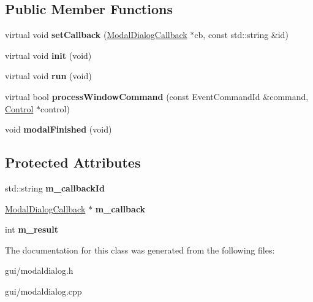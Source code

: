 \subsection*{Public Member Functions}
\begin{DoxyCompactItemize}
\item 
virtual void {\bfseries set\+Callback} (\hyperlink{classModalDialogCallback}{Modal\+Dialog\+Callback} $\ast$cb, const std\+::string \&id)\hypertarget{classModalDialog_a75dc88202c4937959bdbefff7e1edf60}{}\label{classModalDialog_a75dc88202c4937959bdbefff7e1edf60}

\item 
virtual void {\bfseries init} (void)\hypertarget{classModalDialog_ad75668e91a5648a75f004ac8a6d6cb68}{}\label{classModalDialog_ad75668e91a5648a75f004ac8a6d6cb68}

\item 
virtual void {\bfseries run} (void)\hypertarget{classModalDialog_a03956ea8d24136a8dd4ae89330f69caa}{}\label{classModalDialog_a03956ea8d24136a8dd4ae89330f69caa}

\item 
virtual bool {\bfseries process\+Window\+Command} (const Event\+Command\+Id \&command, \hyperlink{classControl}{Control} $\ast$control)\hypertarget{classModalDialog_aefded063f0f416c6f8d931424f446ef5}{}\label{classModalDialog_aefded063f0f416c6f8d931424f446ef5}

\item 
void {\bfseries modal\+Finished} (void)\hypertarget{classModalDialog_adde47f226ccf345f8203e7d3c287087a}{}\label{classModalDialog_adde47f226ccf345f8203e7d3c287087a}

\end{DoxyCompactItemize}
\subsection*{Protected Attributes}
\begin{DoxyCompactItemize}
\item 
std\+::string {\bfseries m\+\_\+callback\+Id}\hypertarget{classModalDialog_a7ddb85e88da122def857416d744d9599}{}\label{classModalDialog_a7ddb85e88da122def857416d744d9599}

\item 
\hyperlink{classModalDialogCallback}{Modal\+Dialog\+Callback} $\ast$ {\bfseries m\+\_\+callback}\hypertarget{classModalDialog_a982dd0bf38e7bf058c8fb052afaf6a6e}{}\label{classModalDialog_a982dd0bf38e7bf058c8fb052afaf6a6e}

\item 
int {\bfseries m\+\_\+result}\hypertarget{classModalDialog_ae91bdb8910c444128eb7cbc847cbac99}{}\label{classModalDialog_ae91bdb8910c444128eb7cbc847cbac99}

\end{DoxyCompactItemize}


The documentation for this class was generated from the following files\+:\begin{DoxyCompactItemize}
\item 
gui/modaldialog.\+h\item 
gui/modaldialog.\+cpp\end{DoxyCompactItemize}
